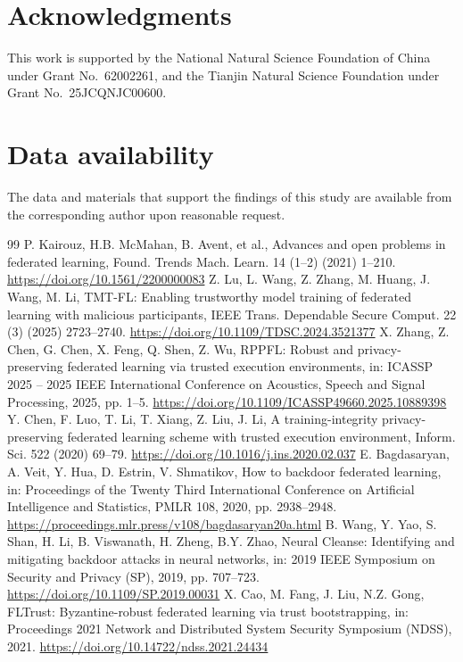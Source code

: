 \documentclass[final,5p,times,twocolumn]{elsarticle/elsarticle}
\begin{document}
\section*{Acknowledgments}
This work is supported by the National Natural Science Foundation of China under Grant No.~62002261, and the Tianjin Natural Science Foundation under Grant No.~25JCQNJC00600.

\section*{Data availability}
The data and materials that support the findings of this study are available from the corresponding author upon reasonable request.

\begin{thebibliography}{99}
     P. Kairouz, H.B. McMahan, B. Avent, et al., Advances and open problems in federated learning, Found. Trends Mach. Learn. 14 (1--2) (2021) 1--210. \url{https://doi.org/10.1561/2200000083}
     Z. Lu, L. Wang, Z. Zhang, M. Huang, J. Wang, M. Li, TMT-FL: Enabling trustworthy model training of federated learning with malicious participants, IEEE Trans. Dependable Secure Comput. 22 (3) (2025) 2723--2740. \url{https://doi.org/10.1109/TDSC.2024.3521377}
     X. Zhang, Z. Chen, G. Chen, X. Feng, Q. Shen, Z. Wu, RPPFL: Robust and privacy-preserving federated learning via trusted execution environments, in: ICASSP 2025 -- 2025 IEEE International Conference on Acoustics, Speech and Signal Processing, 2025, pp. 1--5. \url{https://doi.org/10.1109/ICASSP49660.2025.10889398}
     Y. Chen, F. Luo, T. Li, T. Xiang, Z. Liu, J. Li, A training-integrity privacy-preserving federated learning scheme with trusted execution environment, Inform. Sci. 522 (2020) 69--79. \url{https://doi.org/10.1016/j.ins.2020.02.037}
     E. Bagdasaryan, A. Veit, Y. Hua, D. Estrin, V. Shmatikov, How to backdoor federated learning, in: Proceedings of the Twenty Third International Conference on Artificial Intelligence and Statistics, PMLR 108, 2020, pp. 2938--2948. \url{https://proceedings.mlr.press/v108/bagdasaryan20a.html}
     B. Wang, Y. Yao, S. Shan, H. Li, B. Viswanath, H. Zheng, B.Y. Zhao, Neural Cleanse: Identifying and mitigating backdoor attacks in neural networks, in: 2019 IEEE Symposium on Security and Privacy (SP), 2019, pp. 707--723. \url{https://doi.org/10.1109/SP.2019.00031}
     X. Cao, M. Fang, J. Liu, N.Z. Gong, FLTrust: Byzantine-robust federated learning via trust bootstrapping, in: Proceedings 2021 Network and Distributed System Security Symposium (NDSS), 2021. \url{https://doi.org/10.14722/ndss.2021.24434}

\end{thebibliography}
\end{document}
